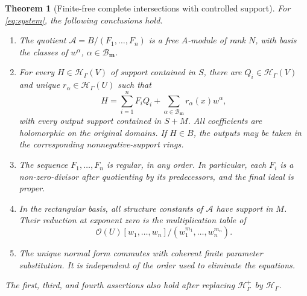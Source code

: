 \documentclass[11pt,oneside]{article}
\numberwithin{equation}{section}
\newtheorem{theorem}{Theorem}[section]
\theoremstyle{definition}
\theoremstyle{remark}\newtheorem{remark}[theorem]{Remark}
\newcommand{\OO}{\mathcal O}
\newcommand{\HH}{\mathcal H_{\Gamma}}
\newcommand{\Hp}{\mathcal H^{+}_{\Gamma}}
\newcommand{\boxset}{\mathcal B_{\boldsymbol m}}
\begin{document}
\begin{theorem}[Finite-free complete intersections with controlled support]\label{thm:finitefree}
For \eqref{eq:system}, the following conclusions hold.
\begin{enumerate}
\item The quotient \(\mathcal A=B/(F_1,\ldots,F_n)\) is a free \(A\)-module of rank \(N\), with basis the classes of \(w^\alpha\), \(\alpha\in\boxset\).
\item For every \(H\in\HH(V)\) of support contained in \(S\), there are \(Q_i\in\HH(V)\) and unique \(r_\alpha\in\HH(U)\) such that
\begin{equation}\label{eq:normalform}
 H=\sum_{i=1}^nF_iQ_i+
 \sum_{\alpha\in\boxset}r_\alpha(x)w^\alpha,
\end{equation}
with every output support contained in \(S+M\). All coefficients are holomorphic on the original domains. If \(H\in B\), the outputs may be taken in the corresponding nonnegative-support rings.
\item The sequence \(F_1,\ldots,F_n\) is regular, in any order. In particular, each \(F_i\) is a non-zero-divisor after quotienting by its predecessors, and the final ideal is proper.
\item In the rectangular basis, all structure constants of \(\mathcal A\) have support in \(M\). Their reduction at exponent zero is the multiplication table of
\[
 \OO(U)[w_1,\ldots,w_n]/(w_1^{m_1},\ldots,w_n^{m_n}).
\]
\item The unique normal form commutes with coherent finite parameter substitution. It is independent of the order used to eliminate the equations.
\end{enumerate}
The first, third, and fourth assertions also hold after replacing \(\Hp\) by \(\HH\).
\end{theorem}
\end{document}
